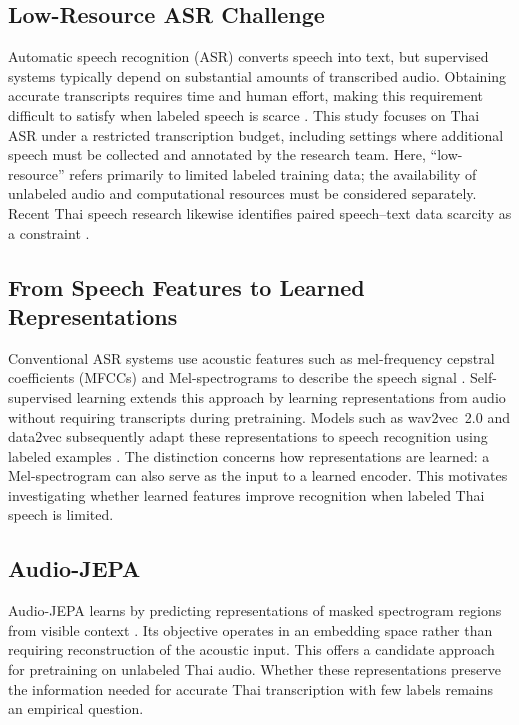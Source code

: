 \documentclass[conference]{IEEEtran}
\begin{document}
\subsection{Low-Resource ASR Challenge}
Automatic speech recognition (ASR) converts speech into text, but supervised systems typically depend on substantial amounts of transcribed audio. Obtaining accurate transcripts requires time and human effort, making this requirement difficult to satisfy when labeled speech is scarce \cite{conneau2021xlsr}. This study focuses on Thai ASR under a restricted transcription budget, including settings where additional speech must be collected and annotated by the research team. Here, ``low-resource'' refers primarily to limited labeled training data; the availability of unlabeled audio and computational resources must be considered separately. Recent Thai speech research likewise identifies paired speech--text data scarcity as a constraint \cite{shao2025xlsrthai}.

\subsection{From Speech Features to Learned Representations}
Conventional ASR systems use acoustic features such as mel-frequency cepstral coefficients (MFCCs) and Mel-spectrograms to describe the speech signal \cite{davis1980mfcc,berrebbi2022spectral}. Self-supervised learning extends this approach by learning representations from audio without requiring transcripts during pretraining. Models such as wav2vec~2.0 and data2vec subsequently adapt these representations to speech recognition using labeled examples \cite{baevski2020wav2vec2,baevski2022data2vec}. The distinction concerns how representations are learned: a Mel-spectrogram can also serve as the input to a learned encoder. This motivates investigating whether learned features improve recognition when labeled Thai speech is limited.

\subsection{Audio-JEPA}
Audio-JEPA learns by predicting representations of masked spectrogram regions from visible context \cite{tuncay2025audiojepa}. Its objective operates in an embedding space rather than requiring reconstruction of the acoustic input. This offers a candidate approach for pretraining on unlabeled Thai audio. Whether these representations preserve the information needed for accurate Thai transcription with few labels remains an empirical question.
\end{document}
